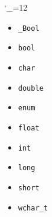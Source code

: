 \begin{multicols}{3}
\catcode`\_=12
\footnotesize
\begin{itemize}
\item \texttt{_Bool}~\pageref{def:_Bool}
\item \texttt{bool}~\pageref{def:bool}
\item \texttt{char}~\pageref{def:char}
\item \texttt{double}~\pageref{def:double}
\item \texttt{enum}~\pageref{def:enum}
\item \texttt{float}~\pageref{def:float}
\item \texttt{int}~\pageref{def:int}
\item \texttt{long}~\pageref{def:long}
\item \texttt{short}~\pageref{def:short}
\item \texttt{wchar_t}~\pageref{def:wchar_t}
\end{itemize}
\end{multicols}
